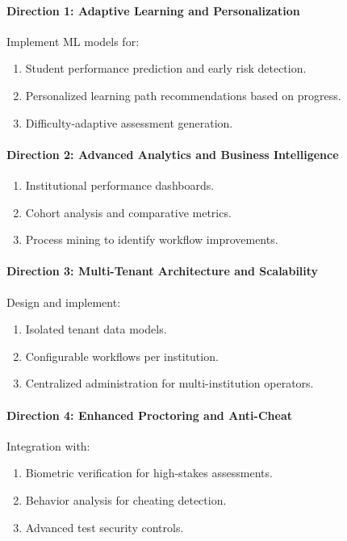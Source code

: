 \documentclass[11pt,a4paper]{article}
\begin{document}
\paragraph{Direction 1: Adaptive Learning and Personalization}

Implement ML models for:

\begin{enumerate}
    \item Student performance prediction and early risk detection.
    \item Personalized learning path recommendations based on progress.
    \item Difficulty-adaptive assessment generation.
\end{enumerate}

\paragraph{Direction 2: Advanced Analytics and Business Intelligence}

\begin{enumerate}
    \item Institutional performance dashboards.
    \item Cohort analysis and comparative metrics.
    \item Process mining to identify workflow improvements.
\end{enumerate}

\paragraph{Direction 3: Multi-Tenant Architecture and Scalability}

Design and implement:

\begin{enumerate}
    \item Isolated tenant data models.
    \item Configurable workflows per institution.
    \item Centralized administration for multi-institution operators.
\end{enumerate}

\paragraph{Direction 4: Enhanced Proctoring and Anti-Cheat}

Integration with:

\begin{enumerate}
    \item Biometric verification for high-stakes assessments.
    \item Behavior analysis for cheating detection.
    \item Advanced test security controls.
\end{enumerate}
\end{document}
